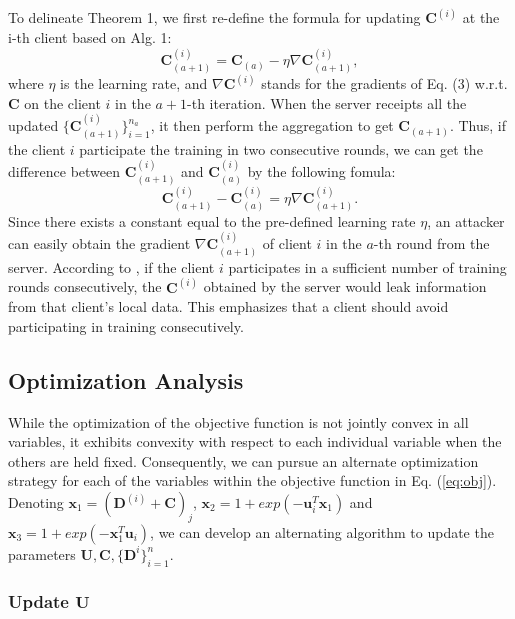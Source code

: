 \documentclass{article} %
\newcommand{\customeqref}[1]{({\ref{#1}})}
\begin{document}
To delineate Theorem 1, we first re-define the formula for updating $\mathbf{C}^{(i)}$ at the i-th client based on Alg. 1:
\begin{equation}
    \mathbf{C}^{(i)}_{(a+1)} = \mathbf{C}_{(a)} - \eta \nabla \mathbf{C}^{(i)}_{(a+1)},
\end{equation}
where $\eta$ is the learning rate, and $\nabla \mathbf{C}^{(i)}$ stands for the gradients of Eq. (3) w.r.t. $\mathbf{C}$ on the client $i$ in the $a+1$-th iteration.
When the server receipts all the updated $\{\mathbf{C}^{(i)}_{(a+1)}\}_{i=1}^{n_a}$, it then perform the aggregation to get $\mathbf{C}_{(a+1)}$.
Thus, if the client $i$ participate the training in two consecutive rounds, we can get the difference between $\mathbf{C}^{(i)}_{(a+1)}$ and $\mathbf{C}^{(i)}_{(a)}$ by the following fomula:
\begin{equation}
    \mathbf{C}^{(i)}_{(a+1)} - \mathbf{C}^{(i)}_{(a)} = \eta \nabla \mathbf{C}^{(i)}_{(a+1)}.
\end{equation}
Since there exists a constant equal to the pre-defined learning rate $\eta$, an attacker can easily obtain the gradient $\nabla \mathbf{C}^{(i)}_{(a+1)}$ of client $i$ in the $a$-th round from the server. 
According to \citet{chai2020secure}, if the client $i$ participates in a sufficient number of training rounds consecutively, the $\mathbf{C}^{(i)}$ obtained by the server would leak information from that client's local data.
This emphasizes that a client should avoid participating in training consecutively.

\subsection{Optimization Analysis}

While the optimization of the objective function is not jointly convex in all variables, it exhibits convexity with respect to each individual variable when the others are held fixed. Consequently, we can pursue an alternate optimization strategy for each of the variables within the objective function in Eq. \customeqref{eq:obj}.
Denoting $\mathbf{x}_1 = (\mathbf{D}^{(i)} + \mathbf{C})_j$, $\mathbf{x}_2=1+exp(-\mathbf{u}_i^T \mathbf{x}_1)$ and $\mathbf{x}_3=1+exp(-\mathbf{x}_1^T \mathbf{u}_i)$, we can develop an alternating algorithm to update the parameters $\mathbf{U}, \mathbf{C},\{ \mathbf{D}^{i}\}^n_{i=1}$.

\subsubsection{Update $\mathbf{U}$}
\end{document}
